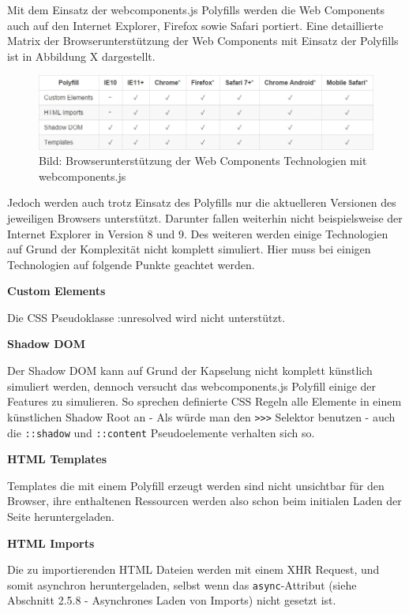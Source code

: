 Mit dem Einsatz der webcomponents.js Polyfills werden die Web Components
auch auf den Internet Explorer, Firefox sowie Safari portiert. Eine
detaillierte Matrix der Browserunterstützung der Web Components mit
Einsatz der Polyfills ist in Abbildung X dargestellt.

\begin{figure}[htbp]
\centering
\includegraphics{images/6-webcomponentsjs-browserunterstuetzung.jpg}
\caption{Bild: Browserunterstützung der Web Components Technologien mit
webcomponents.js}
\end{figure}

Jedoch werden auch trotz Einsatz des Polyfills nur die aktuelleren
Versionen des jeweiligen Browsers unterstützt. Darunter fallen weiterhin
nicht beispielsweise der Internet Explorer in Version 8 und 9. Des
weiteren werden einige Technologien auf Grund der Komplexität nicht
komplett simuliert. Hier muss bei einigen Technologien auf folgende
Punkte geachtet werden.

\textbf{Custom Elements}

Die CSS Pseudoklasse :unresolved wird nicht unterstützt.

\textbf{Shadow DOM}

Der Shadow DOM kann auf Grund der Kapselung nicht komplett künstlich
simuliert werden, dennoch versucht das webcomponents.js Polyfill einige
der Features zu simulieren. So sprechen definierte CSS Regeln alle
Elemente in einem künstlichen Shadow Root an - Als würde man den
\texttt{\textgreater{}\textgreater{}\textgreater{}} Selektor benutzen -
auch die \texttt{::shadow} und \texttt{::content} Pseudoelemente
verhalten sich so.

\textbf{HTML Templates}

Templates die mit einem Polyfill erzeugt werden sind nicht unsichtbar
für den Browser, ihre enthaltenen Ressourcen werden also schon beim
initialen Laden der Seite heruntergeladen.

\textbf{HTML Imports}

Die zu importierenden HTML Dateien werden mit einem XHR Request, und
somit asynchron heruntergeladen, selbst wenn das \texttt{async}-Attribut
(siehe Abschnitt 2.5.8 - Asynchrones Laden von Imports) nicht gesetzt
ist.

